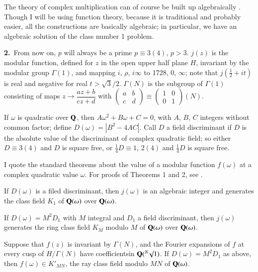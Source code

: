 The theory of complex multiplication can of course be built up algebraically \cite{art03-key3}. Though I will be using function theory, because it is traditional and probably easier, all the constructions are basically algebraic; in particular, we have an algebraic solution of the class number 1 problem.

\medskip
\noindent
{\bf 2.}~From now on, $p$ will always be a prime $p\equiv 3(4)$, $p>3$. $j(z)$ is the modular function, defined for $z$ in the open upper half plane $H$, invariant by the modular group $\Gamma(1)$, and mapping $i$, $\rho$, $i\infty$ to 1728, 0, $\infty$; note that $j(\frac{1}{2}+it)$ is real and negative for real $t>\surd 3/2$. $\Gamma(N)$ is the subgroup of $\Gamma(1)$ consisting of maps $z\to \dfrac{az+b}{cz+d}$ with $\left(\begin{smallmatrix} a & b\\ c & d\end{smallmatrix}\right)\equiv \left(\begin{smallmatrix} 1 & 0\\ 0 & 1\end{smallmatrix}\right)(N)$.

If $\omega$ is quadratic over $\mathbf{Q}$, then $A\omega^{2}+B\omega+C=0$, with $A$, $B$, $C$ integers without common factor; define $D(\omega)=|B^{2}-4AC|$. Call $D$ a field discriminant if $D$ is the absolute value of the discriminant of complex quadratic field; so either $D\equiv 3(4)$ and $D$ is square free, or $\frac{1}{4}D\equiv 1$, $2(4)$ and $\frac{1}{4}D$ is square free.

I quote the standard theorems about the value of a modular function $f(\omega)$ at a complex quadratic value $\omega$. For proofs of Theorems 1 and 2, see \cite{art03-key3}.

\begin{theorem}\label{art03-thm1}
If $D(\omega)$ is a filed discriminant, then $j(\omega)$ is an algebraic integer and generates the class field $K_{1}$ of $\mathbf{Q}(\omega)$ over $\mathbf{Q}(\omega)$.
\end{theorem}

\begin{theorem}\label{art03-thm2}
If $D(\omega)=M^{2}D_{1}$ with $M$ integral and $D_{1}$ a field discriminant, then $j(\omega)$ generates the ring class field $K_{M}$ modulo $M$ of $\mathbf{Q}(\omega)$ over $\mathbf{Q}(\omega)$.
\end{theorem}

\begin{theorem}\label{art03-thm3}
Suppose that $f(z)$ is invariant by $\Gamma(N)$, and the Fourier expansions of $f$ at every cusp of $H/\Gamma(N)$ have coefficients\pageoriginale in $\mathbf{Q}({}^{N}\surd 1)$. If $D(\omega)=M^{2}D_{1}$ as above, then $f(\omega)\in K'_{MN}$, the ray class field modulo $MN$ of $\mathbf{Q}(\omega)$.
\end{theorem}

